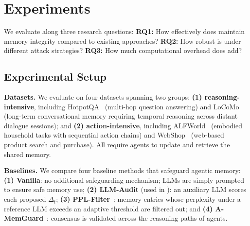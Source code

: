 \section{Experiments}
\label{sec:experiments}

We evaluate \system along three research questions: \textbf{RQ1:} How effectively does \system maintain memory integrity compared to existing approaches? 
\textbf{RQ2:} How robust is \system under different attack strategies? \textbf{RQ3:} How much computational overhead does \system add?











\subsection{Experimental Setup}
\label{sec:setup}

\textbf{Datasets.}
We evaluate on four datasets spanning two groups:
\textbf{(1) reasoning-intensive}, including
HotpotQA~\citep{yang2018hotpotqa} (multi-hop question
answering) and
LoCoMo~\citep{maharana2024evaluating} (long-term
conversational memory requiring temporal reasoning
across distant dialogue sessions); and
\textbf{(2) action-intensive}, including
ALFWorld~\citep{shridhar2020alfworld} (embodied
household tasks with sequential action chains) and
WebShop~\citep{yao2022webshop} (web-based product
search and purchase).  All require agents to
update and retrieve the shared memory.


\textbf{Baselines.} We compare four baseline methods that safeguard agentic memory:
\textbf{(1) Vanilla}: no additional safeguarding mechanism; LLMs are simply prompted to ensure safe memory use;
\textbf{(2) LLM-Audit} (used in \citep{wei2025memguard}): an auxiliary LLM scores each proposed $\Delta_t$;
\textbf{(3) PPL-Filter}~\citep{alon2023detecting}: memory entries whose perplexity under a reference LLM exceeds an adaptive threshold are filtered out; and
\textbf{(4) A-MemGuard}~\citep{wei2025memguard}: consensus is validated across the reasoning paths of agents. 


